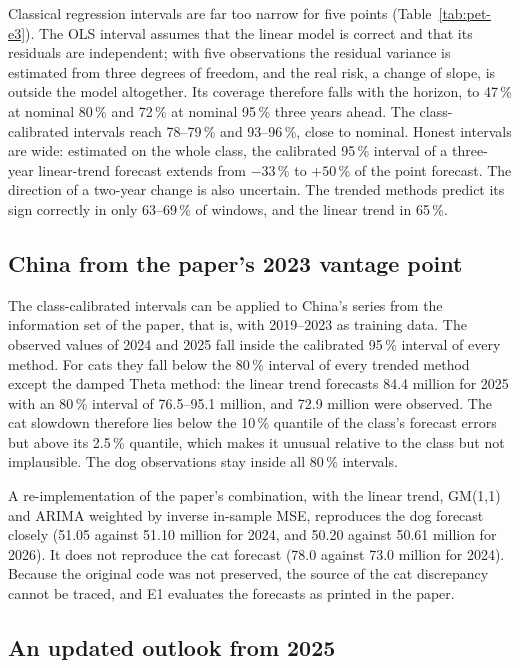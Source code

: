 Classical regression intervals are far too narrow for five points (Table~\ref{tab:pet-e3}). The OLS interval assumes that the linear model is correct and that its residuals are independent; with five observations the residual variance is estimated from three degrees of freedom, and the real risk, a change of slope, is outside the model altogether. Its coverage therefore falls with the horizon, to 47\,\% at nominal 80\,\% and 72\,\% at nominal 95\,\% three years ahead. The class-calibrated intervals reach 78--79\,\% and 93--96\,\%, close to nominal. Honest intervals are wide: estimated on the whole class, the calibrated 95\,\% interval of a three-year linear-trend forecast extends from $-33$\,\% to $+50$\,\% of the point forecast. The direction of a two-year change is also uncertain. The trended methods predict its sign correctly in only 63--69\,\% of windows, and the linear trend in 65\,\%.

\subsection{China from the paper's 2023 vantage point}

The class-calibrated intervals can be applied to China's series from the information set of the paper, that is, with 2019--2023 as training data. The observed values of 2024 and 2025 fall inside the calibrated 95\,\% interval of every method. For cats they fall below the 80\,\% interval of every trended method except the damped Theta method: the linear trend forecasts 84.4 million for 2025 with an 80\,\% interval of 76.5--95.1 million, and 72.9 million were observed. The cat slowdown therefore lies below the 10\,\% quantile of the class's forecast errors but above its 2.5\,\% quantile, which makes it unusual relative to the class but not implausible. The dog observations stay inside all 80\,\% intervals.

A re-implementation of the paper's combination, with the linear trend, GM(1,1) and ARIMA weighted by inverse in-sample MSE, reproduces the dog forecast closely (51.05 against 51.10 million for 2024, and 50.20 against 50.61 million for 2026). It does not reproduce the cat forecast (78.0 against 73.0 million for 2024). Because the original code was not preserved, the source of the cat discrepancy cannot be traced, and E1 evaluates the forecasts as printed in the paper.

\subsection{An updated outlook from 2025}

